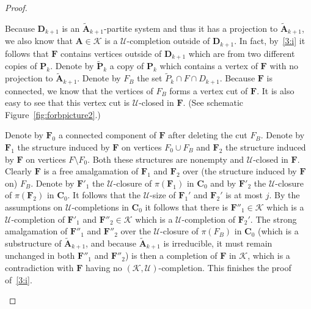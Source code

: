 \documentclass{elsarticle}
\def\str#1{\mathbf {#1}}
\def\K{{\mathcal K}}
\theoremstyle{plain}
\theoremstyle{definition}
\theoremstyle{remark}
\begin{document}
\begin{proof}
\begin{enumerate}
 Because $\str{D}_{k+1}$ is an $\widetilde{\str{A}}_{k+1}$-partite system and thus it has a projection to $\widetilde{\str{A}}_{k+1}$, we also know that $\str{A}\in \K$ is a $\mathcal U$-completion outside of $\str{D}_{k+1}$. In fact, by~\ref{3:i} it follows that $\str{F}$ contains vertices outside of $\str D_{k+1}$ which are from two different copies of $\str{P}_k$. Denote by $\widetilde{\str{P}}_k$ a copy
of $\str{P}_k$ which contains a vertex of $\str{F}$ with no projection to $\widetilde{\str{A}}_{k+1}$.
Denote by $F_B$ the set  $\widetilde{P}_k\cap F\cap D_{k+1}$. Because $\str{F}$ is connected, we know that the vertices of $F_B$ forms a vertex cut of $\str{F}$.
It is also easy to see that this vertex cut is $\mathcal U$-closed in $\str{F}$. (See schematic Figure~\ref{fig:forbpicture2}.)

 Denote by $\str{F}_0$ a connected component of $\str{F}$ after deleting the cut $F_B$. Denote by $\str{F}_1$ the structure induced by $\str{F}$ on vertices $F_0\cup F_B$ and $\str{F}_2$ the structure induced by $\str{F}$ on vertices $F\setminus F_0$. Both these structures are nonempty and $\mathcal U$-closed in $\str{F}$. Clearly $\str{F}$ is a free amalgamation of $\str{F}_1$ and $\str{F}_2$ over (the structure induced by $\str F$ on) $F_B$.
Denote by $\str{F}'_1$ the $\mathcal U$-closure of $\pi(\str{F}_1)$ in $\str{C}_{0}$ and by $\str{F}'_2$ the $\mathcal U$-closure of $\pi(\str{F}_2)$ in $\str{C}_{0}$. It follows that the $\mathcal U$-size of $\str{F}_1'$ and $\str{F}_2'$ is at most $j$. By the assumptions on $\mathcal U$-completions in $\str{C}_0$ it follows that there is $\str{F}''_1\in \K$ which is a $\mathcal U$-completion of $\str{F}'_1$ and $\str{F}''_2\in \K$ which is a $\mathcal U$-completion of $\str{F}_2'$.  
The strong amalgamation of $\str{F}''_1$ and $\str{F}''_2$ over the $\mathcal U$-closure of $\pi(F_B)$ in $\str{C}_0$ (which is a substructure of $\widetilde{\str{A}}_{k+1}$, and because $\widetilde{\str{A}}_{k+1}$ is irreducible, it must remain unchanged in both $\str{F}''_1$ and $\str{F}''_2$) is then a completion of $\str{F}$ in $\K$, which is a contradiction with $\str{F}$ having no $(\K,\mathcal U)$-completion. This finishes the proof of~\ref{3:i}.
\end{enumerate}
\end{proof}
\end{document}
